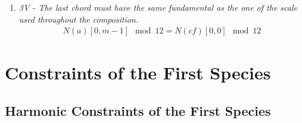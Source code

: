\begin{enumerate}[wide, label=\bfseries G\arabic*]
\item \textit{3V - The last chord must have the same fundamental as the one of the scale used throughout the composition.}\label{rule:same-fundamental-appendix}
\begin{equation} \begin{aligned}
    N(a)[0, m-1] \mod 12 = N(\mathit{cf})[0, 0] \mod 12
    \end{aligned} \end{equation}
\end{enumerate}


\section*{Constraints of the First Species}
\subsection*{Harmonic Constraints of the First Species}

